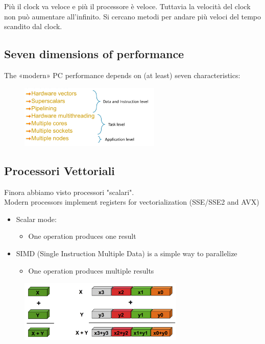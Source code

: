 Più il clock va veloce e più il processore è veloce. Tuttavia la velocità del clock non può aumentare all'infinito. Si cercano metodi per andare più veloci del tempo scandito dal clock.\\

\subsection{Seven dimensions of performance}
The «modern» PC performance depends on (at least) seven characteristics:

\begin{figure}[ht]
    \centering
    \includegraphics[width=0.6\textwidth]{figure_parallel/7perf.png}
\end{figure}
\FloatBarrier

\subsection{Processori Vettoriali}
Finora abbiamo visto processori "scalari".\\
Modern processors implement registers for vectorialization (SSE/SSE2 and
AVX)

\begin{itemize}
    \item Scalar mode:
    \begin{itemize}
        \item One operation produces one result
    \end{itemize}
    \item SIMD (Single Instruction Multiple Data) is a simple way to parallelize
    \begin{itemize}
        \item One operation produces multiple results
    \end{itemize}
\end{itemize}

\begin{figure}[ht]
    \centering
    \includegraphics[width=0.7\textwidth]{figure_parallel/vector_sum.png}
\end{figure}
\FloatBarrier


